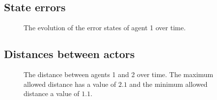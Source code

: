 \subsection{State errors}
\label{subsection:d_OFF_errors_3_2}

\begin{figure}[H]\centering
  \scalebox{0.7}{}
  \caption{The evolution of the error states of agent 1 over time.}
  \label{fig:d_OFF_3_2_errors_agent_1}
\end{figure}

\noindent{}


\subsection{Distances between actors}
\label{subsection:d_OFF_distances_3_2}

\begin{figure}[H]\centering
  \scalebox{0.7}{}
  \caption{The distance between agents 1 and 2 over time. The maximum allowed
    distance has a value of $2.1$ and the minimum allowed distance a value
    of $1.1$.}
  \label{fig:d_OFF_3_2_distance_agents_12}
\end{figure}

